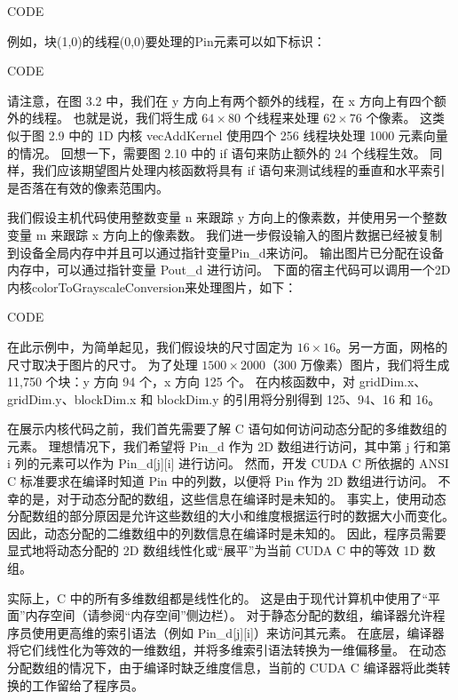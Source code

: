 {\color{red} CODE}

例如，块(1,0)的线程(0,0)要处理的Pin元素可以如下标识：

{\color{red} CODE}

请注意，在图 3.2 中，我们在 y 方向上有两个额外的线程，在 x 方向上有四个额外的线程。 
也就是说，我们将生成 $64 \times 80$ 个线程来处理 $62 \times 76$ 个像素。 
这类似于图 2.9 中的 1D 内核 vecAddKernel 使用四个 256 线程块处理 1000 元素向量的情况。 
回想一下，需要图 2.10 中的 if 语句来防止额外的 24 个线程生效。 
同样，我们应该期望图片处理内核函数将具有 if 语句来测试线程的垂直和水平索引是否落在有效的像素范围内。

我们假设主机代码使用整数变量 n 来跟踪 y 方向上的像素数，并使用另一个整数变量 m 来跟踪 x 方向上的像素数。 
我们进一步假设输入的图片数据已经被复制到设备全局内存中并且可以通过指针变量Pin\_d来访问。 
输出图片已分配在设备内存中，可以通过指针变量 Pout\_d 进行访问。 
下面的宿主代码可以调用一个2D内核colorToGrayscaleConversion来处理图片，如下：

{\color{red} CODE}

在此示例中，为简单起见，我们假设块的尺寸固定为 $16 \times 16$。另一方面，网格的尺寸取决于图片的尺寸。 
为了处理 $1500 \times 2000$（300 万像素）图片，我们将生成 11,750 个块：y 方向 94 个，x 方向 125 个。 
在内核函数中，对 gridDim.x、gridDim.y、blockDim.x 和 blockDim.y 的引用将分别得到 125、94、16 和 16。

在展示内核代码之前，我们首先需要了解 C 语句如何访问动态分配的多维数组的元素。 
理想情况下，我们希望将 Pin\_d 作为 2D 数组进行访问，其中第 j 行和第 i 列的元素可以作为 Pin\_d[j][i] 进行访问。 
然而，开发 CUDA C 所依据的 ANSI C 标准要求在编译时知道 Pin 中的列数，以便将 Pin 作为 2D 数组进行访问。 
不幸的是，对于动态分配的数组，这些信息在编译时是未知的。 
事实上，使用动态分配数组的部分原因是允许这些数组的大小和维度根据运行时的数据大小而变化。 
因此，动态分配的二维数组中的列数信息在编译时是未知的。 
因此，程序员需要显式地将动态分配的 2D 数组线性化或“展平”为当前 CUDA C 中的等效 1D 数组。

实际上，C 中的所有多维数组都是线性化的。 这是由于现代计算机中使用了“平面”内存空间（请参阅“内存空间”侧边栏）。 
对于静态分配的数组，编译器允许程序员使用更高维的索引语法（例如 Pin\_d[j][i]）来访问其元素。 
在底层，编译器将它们线性化为等效的一维数组，并将多维索引语法转换为一维偏移量。 
在动态分配数组的情况下，由于编译时缺乏维度信息，当前的 CUDA C 编译器将此类转换的工作留给了程序员。

